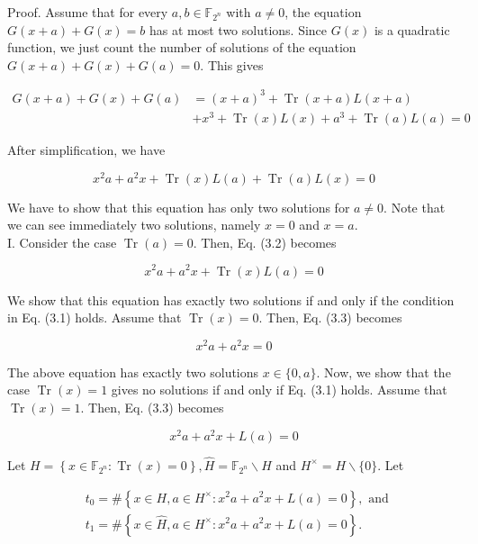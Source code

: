 \documentclass[10pt]{article}
\begin{document}
Proof. Assume that for every $a, b \in \mathbb{F}_{2^{n}}$ with $a \neq 0$, the equation $G(x+a)+G(x)=b$ has at most two solutions. Since $G(x)$ is a quadratic function, we just count the number of solutions of the equation $G(x+a)+G(x)+G(a)=0$. This gives

$$
\begin{aligned}
G(x+a)+G(x)+G(a) & =(x+a)^{3}+\operatorname{Tr}(x+a) L(x+a) \\
& +x^{3}+\operatorname{Tr}(x) L(x)+a^{3}+\operatorname{Tr}(a) L(a)=0
\end{aligned}
$$

After simplification, we have


\begin{equation*}
x^{2} a+a^{2} x+\operatorname{Tr}(x) L(a)+\operatorname{Tr}(a) L(x)=0 \tag{3.2}
\end{equation*}


We have to show that this equation has only two solutions for $a \neq 0$. Note that we can see immediately two solutions, namely $x=0$ and $x=a$.\\
I. Consider the case $\operatorname{Tr}(a)=0$. Then, Eq. (3.2) becomes


\begin{equation*}
x^{2} a+a^{2} x+\operatorname{Tr}(x) L(a)=0 \tag{3.3}
\end{equation*}


We show that this equation has exactly two solutions if and only if the condition in Eq. (3.1) holds. Assume that $\operatorname{Tr}(x)=0$. Then, Eq. (3.3) becomes

$$
x^{2} a+a^{2} x=0
$$

The above equation has exactly two solutions $x \in\{0, a\}$. Now, we show that the case $\operatorname{Tr}(x)=1$ gives no solutions if and only if Eq. (3.1) holds. Assume that $\operatorname{Tr}(x)=1$. Then, Eq. (3.3) becomes


\begin{equation*}
x^{2} a+a^{2} x+L(a)=0 \tag{3.4}
\end{equation*}


Let $H=\left\{x \in \mathbb{F}_{2^{n}}: \operatorname{Tr}(x)=0\right\}, \hat{H}=\mathbb{F}_{2^{n}} \backslash H$ and $H^{\times}=H \backslash\{0\}$. Let

$$
\begin{aligned}
& t_{0}=\#\left\{x \in H, a \in H^{\times}: x^{2} a+a^{2} x+L(a)=0\right\}, \text { and } \\
& t_{1}=\#\left\{x \in \hat{H}, a \in H^{\times}: x^{2} a+a^{2} x+L(a)=0\right\} .
\end{aligned}
$$
\end{document}
